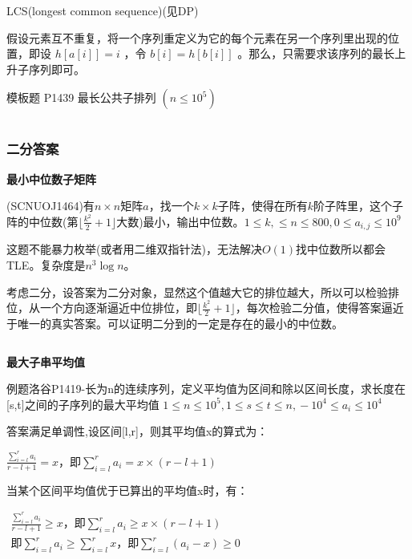 \documentclass[twocolumn,10pt]{ctexart}
\makeatletter
\newcommand{\hfive}[1]{\par\addvspace{6pt}\@afterindentfalse
  {\noindent\bfseries\normalsize #1}\par\nobreak\vspace{2pt}}
\makeatother
\begin{document}
LCS(longest common sequence)(见DP)

假设元素互不重复，将一个序列重定义为它的每个元素在另一个序列里出现的位置，即设 $h[a[i]]=i$ ，令 $b[i]=h[b[i]]$ 。那么，只需要求该序列的最长上升子序列即可。

\begin{notebox}
模板题 P1439 最长公共子排列 $(n\le10^5)$
\end{notebox}

\inputminted{cpp}{code/p1439_LCS.cpp}

\subsubsection{二分答案}

\hfive{最小中位数子矩阵}

\begin{notebox}
(SCNUOJ1464)有$n\times n$矩阵$a$，找一个$k\times k$子阵，使得在所有$k$阶子阵里，这个子阵的中位数(第$\lfloor\frac{k^2}2+1\rfloor$大数)最小，输出中位数。$1\le k,\allowbreak{}\le n\le800,\allowbreak{}0\le a_{i,\allowbreak{}j}\le10^9$
\end{notebox}

这题不能暴力枚举(或者用二维双指针法)，无法解决$O(1)$找中位数所以都会TLE。复杂度是$n^3\log n$。

考虑二分，设答案为二分对象，显然这个值越大它的排位越大，所以可以检验排位，从一个方向逐渐逼近中位排位，即$\lfloor\frac{k^2}2+1\rfloor$，每次检验二分值，使得答案逼近于唯一的真实答案。可以证明二分到的一定是存在的最小的中位数。

\inputminted{cpp}{code/eg1_binaryans.cpp}

\hfive{最大子串平均值}

\begin{notebox}
例题洛谷P1419-长为n的连续序列，定义平均值为区间和除以区间长度，求长度在[s,t]之间的子序列的最大平均值 $1\le n\le10^5,\allowbreak{}1\le s\le t\le n,\allowbreak{}-10^4\le a_i\le10^4$
\end{notebox}

答案满足单调性,设区间[l,r]，则其平均值x的算式为：

\begin{adjustbox}{max width=\linewidth,center}
$\frac{\sum_{i=l}^ra_i}{r-l+1}=x\text{，即}\sum_{i=l}^ra_i=x\times(r-l+1)$
\end{adjustbox}

当某个区间平均值优于已算出的平均值x时，有：

\begin{adjustbox}{max width=\linewidth,center}
$\begin{gathered}
\frac{\sum_{i=l}^ra_i}{r-l+1}\ge x\text{，即}\sum_{i=l}^ra_i\ge x\times(r-l+1)\\\text{即}\sum_{i=l}^ra_i\ge\sum_{i=l}^rx\text{，即}\sum_{i=l}^r(a_i-x)\ge0
\end{gathered}$
\end{adjustbox}
\end{document}
